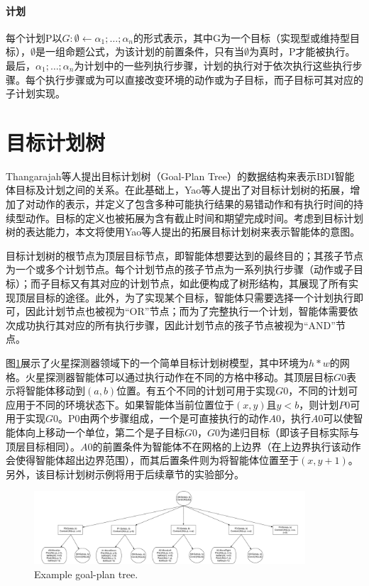 \paragraph{计划}
每个计划P以$G:\emptyset \gets \alpha_1; \dots;\alpha_n$的形式表示，其中G为一个目标（实现型或维持型目标），$\emptyset$是一组命题公式，为该计划的前置条件，只有当$\emptyset$为真时，P才能被执行。最后，$\alpha_1; \dots;\alpha_n$为计划中的一些列执行步骤，计划的执行对于依次执行这些执行步骤。每个执行步骤或为可以直接改变环境的动作或为子目标，而子目标可其对应的子计划实现。

\section{目标计划树}
Thangarajah等人提出目标计划树（Goal-Plan Tree）\cite{DBLP:journals/jar/ThangarajahP11,DBLP:conf/ijcai/ThangarajahPW03,DBLP:conf/ijcai/ThangarajahPW03,DBLP:conf/ecai/ThangarajahWPF02}的数据结构来表示BDI智能体目标及计划之间的关系。在此基础上，Yao等人提出了对目标计划树的拓展\cite{DBLP:conf/atal/YaoSL16}，增加了对动作的表示，并定义了包含多种可能执行结果的易错动作和有执行时间的持续型动作。目标的定义也被拓展为含有截止时间和期望完成时间。考虑到目标计划树的表达能力，本文将使用Yao等人提出的拓展目标计划树来表示智能体的意图。

目标计划树的根节点为顶层目标节点，即智能体想要达到的最终目的；其孩子节点为一个或多个计划节点。每个计划节点的孩子节点为一系列执行步骤（动作或子目标）；而子目标又有其对应的计划节点，如此便构成了树形结构，其展现了所有实现顶层目标的途径。此外，为了实现某个目标，智能体只需要选择一个计划执行即可，因此计划节点也被视为“OR”节点；而为了完整执行一个计划，智能体需要依次成功执行其对应的所有执行步骤，因此计划节点的孩子节点被视为“AND”节点。

图\ref{fig:gpt}展示了火星探测器领域下的一个简单目标计划树模型，其中环境为$h*w$的网格。火星探测器智能体可以通过执行动作在不同的方格中移动。其顶层目标$G0$表示将智能体移动到$(a,b)$位置。有五个不同的计划可用于实现$G0$，不同的计划可应用于不同的环境状态下。如果智能体当前位置位于$(x,y)$且$y < b$，则计划$P0$可用于实现$G0$。P0由两个步骤组成，一个是可直接执行的动作$A0$，执行$A0$可以使智能体向上移动一个单位，第二个是子目标$G0$，$G0$为递归目标（即该子目标实际与顶层目标相同）。$A0$的前置条件为智能体不在网格的上边界（在上边界执行该动作会使得智能体超出边界范围），而其后置条件则为将智能体位置至于$(x,y+1)$。另外，该目标计划树示例将用于后续章节的实验部分。
\begin{figure}[htb]
\centering
\includegraphics[width=0.9\textwidth]{./figs/MarsRover_GPT}
\caption{Example goal-plan tree.}
\label{fig:gpt}
\end{figure}

